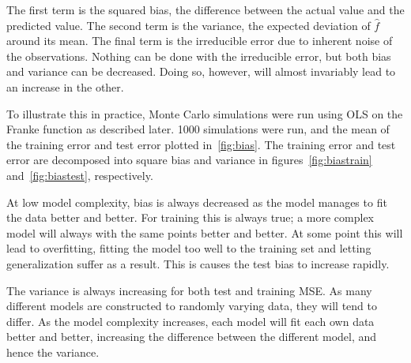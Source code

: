 The first term is the squared bias, the difference between the actual value and the
predicted value. The second term is the variance, the expected deviation of
\(\hat f\) around its mean. The final term is the irreducible error due to
inherent noise of the observations. Nothing can be done with the irreducible
error, but both bias and variance can be decreased. Doing so, however, will
almost invariably lead to an increase in the other. 

To illustrate this in practice, Monte Carlo simulations were run using OLS on
the Franke function as described later. 1000 simulations were run, and the mean
of the training error and test error plotted in~\cref{fig:bias}. The training
error and test error are decomposed into square bias and variance in figures~\ref{fig:biastrain}
and~\ref{fig:biastest}, respectively.

At low model complexity, bias is always decreased as the model manages to fit
the data better and better. For training this is always true; a more complex
model will always with the same points better and better. At some point this
will lead to overfitting, fitting the model too well to the training set and
letting generalization suffer as a result. This is causes the test bias to
increase rapidly.

The variance is always increasing for both test and training MSE. As many
different models are constructed to randomly varying data, they will tend to
differ. As the model complexity increases, each model will fit each own data
better and better, increasing the difference between the different model, and
hence the variance. 

